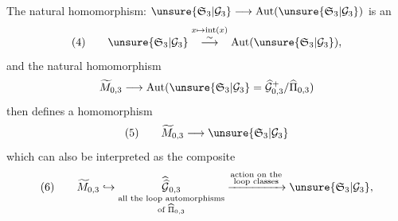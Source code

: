 The natural homomorphism: $\unsure{\mathfrak S_3|\mathcal G_3}\longrightarrow\operatorname{Aut}(\unsure{\mathfrak S_3|\mathcal G_3})$ is an 
\[
(4)\qquad\unsure{\mathfrak S_3|\mathcal G_3}\overset{x\mapsto\operatorname{int}(x)}{\overset{\sim}{\longrightarrow}}\operatorname{Aut}(\unsure{\mathfrak S_3|\mathcal G_3}),
\]
and the natural homomorphism
\[
\widetilde M_{0,3}\longrightarrow\operatorname{Aut}(\unsure{\mathfrak S_3|\mathcal G_3}=\widehat{\mathcal G}_{0,3}^{+}/\widehat{\Pi}_{0,3})
\]
then defines a homomorphism
\[
(5)\qquad\widetilde M_{0,3}\longrightarrow\unsure{\mathfrak S_3|\mathcal G_3}
\]
which can also be interpreted as the composite
\[
(6)\qquad\widetilde M_{0,3}\hookrightarrow
\underset{\substack{\text{all the loop automorphisms}\\\text{of }\widehat{\Pi}_{0,3}}}{\widehat{\widehat{\mathcal G}}_{0,3}}
\xrightarrow{\substack{\text{action on the}\\\text{loop classes}}}
\unsure{\mathfrak S_3|\mathcal G_3},
\]